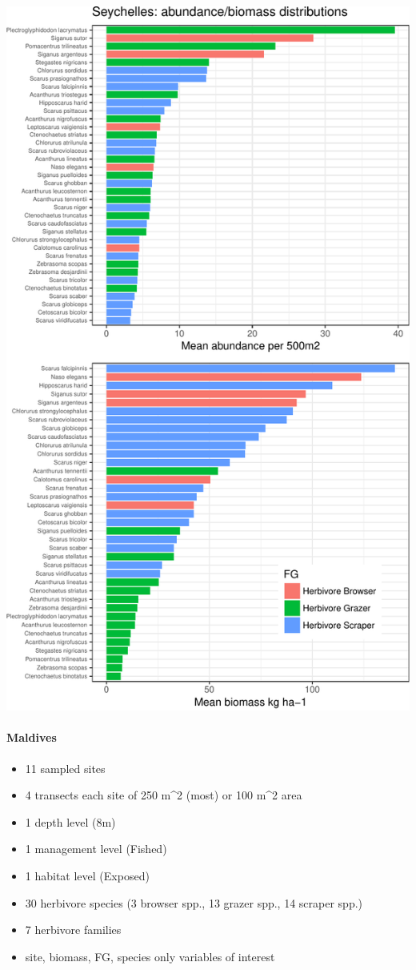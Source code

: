\documentclass[]{article}
\providecommand{\tightlist}{%
  \setlength{\itemsep}{0pt}\setlength{\parskip}{0pt}}
\let\oldparagraph\paragraph
\renewcommand{\paragraph}[1]{\oldparagraph{#1}\mbox{}}
\begin{document}
\includegraphics{UVC-datasets-explore_files/figure-latex/unnamed-chunk-5-1.pdf}

\paragraph{Maldives}\label{maldives}

\begin{itemize}
\tightlist
\item
  11 sampled sites
\item
  4 transects each site of 250 m\^{}2 (most) or 100 m\^{}2 area
\item
  1 depth level (8m)
\item
  1 management level (Fished)
\item
  1 habitat level (Exposed)
\item
  30 herbivore species (3 browser spp., 13 grazer spp., 14 scraper spp.)
\item
  7 herbivore families
\item
  site, biomass, FG, species only variables of interest
\end{itemize}
\end{document}
